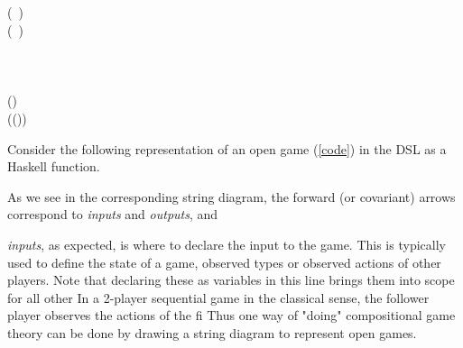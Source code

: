 \framedhs
\begin{hscode}\SaveRestoreHook
	\>[B]{}\mathbin{::}\to {}\;\<[E]%
	\\
	\>[B]{}\;\mathrel{=}{}\<[E]%
	\\
	\>[B]{}\<[5]%
	\>[5]{}\<[E]%
	\\
	\>[5]{}\<[9]%
	\>[9]{}\leftarrow {}\<[E]%
	\\
	\>[5]{}\<[9]%
	\>[9]{}\leftarrow {}\mathbin{\$}(\mathbin{\$}\ )\mathbin{\circ}\<[E]%
	\\
	\>[5]{}\<[9]%
	\>[9]{}\leftarrow {}\mathbin{\$}(\mathbin{\$}\ )\mathbin{\circ}\<[E]%
	\\
	\>[5]{}\<[9]%
	\>[9]{}\leftarrow {}\;\<[E]%
	\\
	\>[5]{}\<[9]%
	\>[9]{}\leftarrow {}\;\<[E]%
	\\
	\>[5]{}\<[9]%
	\>[9]{}\mathbin{\$}{}\<[E]%
	\\
	\>[9]{}\<[13]%
	\>[13]{}(\mathbin{-})\mathbin{*}{}\<[E]%
	\\
	\>[13]{}\<[17]%
	\>[17]{}(\mathbin{+}(\mathbin{-})\mathbin{*}){}\<[E]%
	\ColumnHook
\end{hscode}\resethooks
Consider the following representation of an open game (\ref{code}) in the DSL as a Haskell function.


As we see in the corresponding string diagram, the forward (or covariant) arrows correspond to \textit{inputs} and \textit{outputs}, and 

\textit{inputs}, as expected, is where to declare the input to the game. This is typically used  to define the state of a game, observed types or observed actions of other players. Note that declaring these as variables in this line brings them into scope for all other In a 2-player sequential game in the classical sense, the follower player observes the actions of the fi
Thus one way of "doing" compositional game theory can be done by drawing a string diagram to represent open games. 


